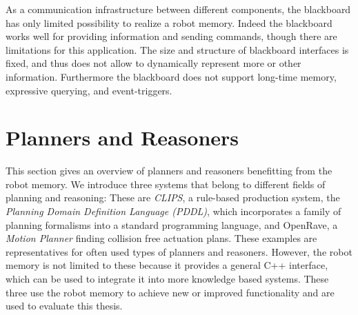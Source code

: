 As a communication infrastructure between different components, the
blackboard has only limited possibility to realize a robot memory.
Indeed the blackboard works well for providing information and sending
commands, though there are limitations for this application. The size
and structure of blackboard interfaces is fixed, and thus does not
allow to dynamically represent more or other information.  Furthermore
the blackboard does not support long-time memory, expressive querying,
and event-triggers.

\section{Planners and Reasoners}
\label{sec:planners}
This section gives an overview of planners and reasoners benefitting
from the robot memory. We introduce three systems that belong to
different fields of planning and reasoning: These are \emph{CLIPS}, a
rule-based production system, the \emph{Planning Domain Definition
  Language (PDDL)}, which incorporates a family of planning formalisms
into a standard programming language, and OpenRave, a \emph{Motion
  Planner} finding collision free actuation plans.  These examples are
representatives for often used types of planners and
reasoners. However, the robot memory is not limited to these because
it provides a general C++ interface, which can be used to integrate it
into more knowledge based systems. These three use the robot memory
to achieve new or improved functionality and are used to evaluate this
thesis.

